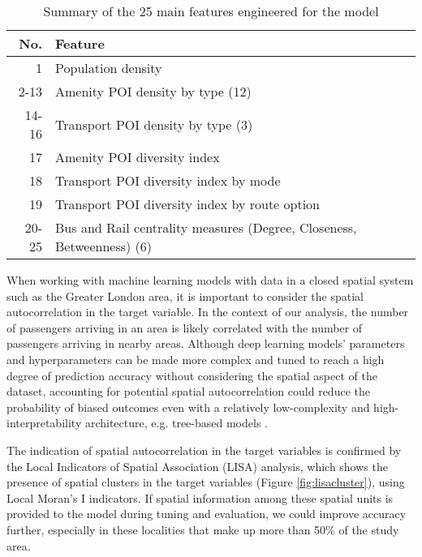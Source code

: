 \begin{table}[!ht]
    \centering
    \renewcommand{\arraystretch}{1.25}
    \begin{tabular}{|r||l|}
        \hline
        \rowcolor{lightgray}
        \textbf{No.} & \textbf{Feature} \\
        \hline
        1 & Population density \\
        2-13 & Amenity POI density by type (12) \\
        14-16 & Transport POI density by type (3) \\
        17 & Amenity POI diversity index \\
        18 & Transport POI diversity index by mode \\
        19 & Transport POI diversity index by route option \\
        20-25 & Bus and Rail centrality measures (Degree, Closeness, Betweenness) (6) \\
        \hline
    \end{tabular}
    \caption{Summary of the 25 main features engineered for the model}
    \label{tab:features}
\end{table}

When working with machine learning models with data in a closed spatial system such as the Greater London area, it is important to consider the spatial autocorrelation in the target variable. In the context of our analysis, the number of passengers arriving in an area is likely correlated with the number of passengers arriving in nearby areas. Although deep learning models' parameters and hyperparameters can be made more complex and tuned to reach a high degree of prediction accuracy without considering the spatial aspect of the dataset, accounting for potential spatial autocorrelation could reduce the probability of biased outcomes even with a relatively low-complexity and high-interpretability architecture, e.g. tree-based models \citep{meyerImportanceSpatialPredictor2019}.

The indication of spatial autocorrelation in the target variables is confirmed by the Local Indicators of Spatial Association (LISA) analysis, which shows the presence of spatial clusters in the target variables (Figure \ref{fig:lisacluster}), using Local Moran's I indicators. If spatial information among these spatial units is provided to the model during tuning and evaluation, we could improve accuracy further, especially in these localities that make up more than 50\% of the study area.  

